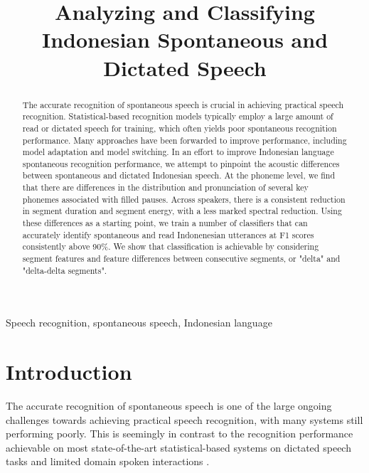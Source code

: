 \documentclass[conference]{IEEEtran}
\begin{document}
\title{Analyzing and Classifying Indonesian Spontaneous and Dictated Speech}

\author {
}

\maketitle

\begin{abstract}
The accurate recognition of spontaneous speech is crucial in achieving practical speech recognition.
Statistical-based recognition models typically employ a large amount of read or dictated speech for training, which often yields poor spontaneous recognition performance.
Many approaches have been forwarded to improve performance, including model adaptation and model switching.
In an effort to improve Indonesian language spontaneous recognition performance, we attempt to pinpoint the acoustic differences between spontaneous and dictated Indonesian speech.
At the phoneme level, we find that there are differences in the distribution and pronunciation of several key phonemes associated with filled pauses.
Across speakers, there is a consistent reduction in segment duration and segment energy, with a less marked spectral reduction.
Using these differences as a starting point, we train a number of classifiers that can accurately identify spontaneous and read Indonenesian utterances at F1 scores consistently above 90\%.
We show that classification is achievable by considering segment features and feature differences between consecutive segments, or "delta" and "delta-delta segments".
\end{abstract}

\begin{IEEEkeywords}
Speech recognition, spontaneous speech, Indonesian language
\end{IEEEkeywords}

\IEEEpeerreviewmaketitle

\section{Introduction}
The accurate recognition of spontaneous speech is one of the large ongoing challenges towards achieving practical speech recognition, with many systems still performing poorly.
This is seemingly in contrast to the recognition performance achievable on most state-of-the-art statistical-based systems on dictated speech tasks and limited domain spoken interactions \cite{furui2}.
\end{document}
